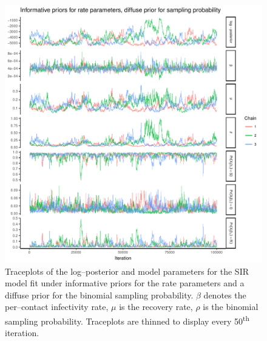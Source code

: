 \begin{figure}[htbp]
	\centering
	\includegraphics[width=0.9\linewidth]{figures/informative_diffuse_traceplots.pdf}
	\caption[Simuation 4 MCMC traceplots for SIR model parameters fit under diffuse priors for the measurement process and informative priors for rate parameters.]{Traceplots of the log--posterior and model parameters for the SIR model fit under informative priors for the rate parameters and a diffuse prior for the binomial sampling probability. $ \beta $ denotes the per--contact infectivity rate, $ \mu $ is the recovery rate, $ \rho $ is the binomial sampling probability. Traceplots are thinned to display every 50\textsuperscript{th} iteration.}
	\label{fig:inform_diffuse_traces}
\end{figure}

